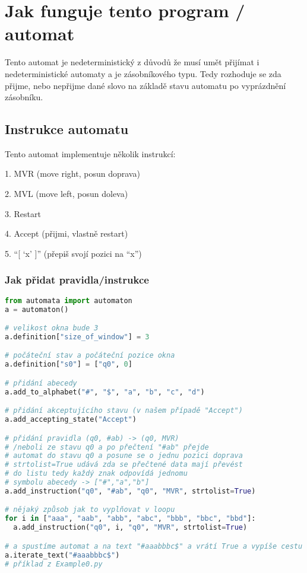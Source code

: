 \documentclass{article}
\begin{document}
\section{Jak funguje tento program / automat}

Tento automat je nedeterministický z důvodů že musí umět přijímat i nedeterministické automaty a je zásobníkového typu. Tedy rozhoduje se zda přijme, nebo nepřijme dané slovo na základě stavu automatu po vyprázdnění zásobníku.

\subsection{Instrukce automatu}

Tento automat implementuje několik instrukcí:

1.  MVR (move right, posun doprava)

2.  MVL (move left, posun doleva)

3.  Restart

4.  Accept (přijmi, vlastně restart)

5.  “[ ‘x’ ]” (přepiš svojí pozici na “x”)


\subsubsection{Jak přidat pravidla/instrukce}

\begin{lstlisting}[language=Python, caption=Příklad použití]
from automata import automaton
a = automaton()

# velikost okna bude 3
a.definition["size_of_window"] = 3

# počáteční stav a počáteční pozice okna
a.definition["s0"] = ["q0", 0]

# přidání abecedy
a.add_to_alphabet("#", "$", "a", "b", "c", "d")

# přidání akceptujícího stavu (v našem případě "Accept")
a.add_accepting_state("Accept")

# přidání pravidla (q0, #ab) -> (q0, MVR)
# /neboli ze stavu q0 a po přečtení "#ab" přejde
# automat do stavu q0 a posune se o jednu pozici doprava
# strtolist=True udává zda se přečtené data mají převést
# do listu tedy každý znak odpovídá jednomu
# symbolu abecedy -> ["#","a","b"]
a.add_instruction("q0", "#ab", "q0", "MVR", strtolist=True)

# nějaký způsob jak to vyplňovat v loopu
for i in ["aaa", "aab", "abb", "abc", "bbb", "bbc", "bbd"]:
  a.add_instruction("q0", i, "q0", "MVR", strtolist=True)

# a spustíme automat a na text "#aaabbbc$" a vrátí True a vypíše cestu s barevně označeým oknem
a.iterate_text("#aaabbbc$")
# příklad z Example0.py
\end{lstlisting}
\end{document}
